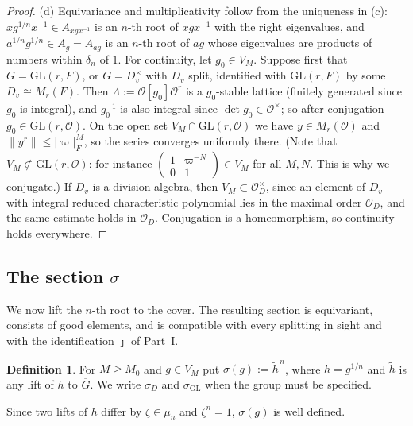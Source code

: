 \documentclass[12pt]{article}
\newcommand{\ov}[1]{\overline{#1}}
\newcommand{\cO}{\mathcal{O}}
\newcommand{\GL}{\mathrm{GL}}
\newcommand{\Gb}{\ov{G}}
\newcommand{\jj}{\jmath}
\newcommand{\sg}{\sigma}
\theoremstyle{plain}
\theoremstyle{definition}
\newtheorem{definition}[theorem]{Definition}
\begin{document}
\begin{proof}
(d) Equivariance and multiplicativity follow from the uniqueness in (c): $xg^{1/n}x^{-1}\in A_{xgx^{-1}}$ is an $n$-th root of $xgx^{-1}$ with the right eigenvalues, and $a^{1/n}g^{1/n}\in A_g=A_{ag}$ is an $n$-th root of $ag$ whose eigenvalues are products of numbers within $\delta_n$ of $1$. For continuity, let $g_0\in V_M$. Suppose first that $G=\GL(r,F)$, or $G=D_v^\times$ with $D_v$ split, identified with $\GL(r,F)$ by some $D_v\cong M_r(F)$. Then $\Lambda:=\cO[g_0]\cO^r$ is a $g_0$-stable lattice (finitely generated since $g_0$ is integral), and $g_0^{-1}$ is also integral since $\det g_0\in\cO^\times$; so after conjugation $g_0\in\GL(r,\cO)$. On the open set $V_M\cap\GL(r,\cO)$ we have $y\in M_r(\cO)$ and $\|y^r\|\le|\varpi|_F^M$, so the series converges uniformly there. (Note that $V_M\not\subset\GL(r,\cO)$: for instance $\left(\begin{smallmatrix}1&\varpi^{-N}\\0&1\end{smallmatrix}\right)\in V_M$ for all $M,N$. This is why we conjugate.) If $D_v$ is a division algebra, then $V_M\subset\cO_D^\times$, since an element of $D_v$ with integral reduced characteristic polynomial lies in the maximal order $\cO_D$, and the same estimate holds in $\cO_D$. Conjugation is a homeomorphism, so continuity holds everywhere.
\end{proof}


\subsection{The section $\sg$}\label{subsec:section}
We now lift the $n$-th root to the cover. The resulting section is equivariant, consists of good elements, and is compatible with every splitting in sight and with the identification $\jj$ of Part~I.

\begin{definition}
For $M\ge M_0$ and $g\in V_M$ put $\sg(g):=\tilde h^{\,n}$, where $h=g^{1/n}$ and $\tilde h$ is any lift of $h$ to $\Gb$. We write $\sg_D$ and $\sg_{\GL}$ when the group must be specified.
\end{definition}

Since two lifts of $h$ differ by $\zeta\in\mu_n$ and $\zeta^n=1$, $\sg(g)$ is well defined.
\end{document}

